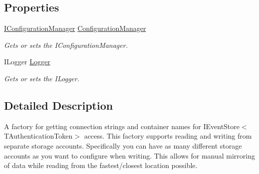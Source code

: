 \subsection*{Properties}
\begin{DoxyCompactItemize}
\item 
\hyperlink{interfaceCqrs_1_1Configuration_1_1IConfigurationManager}{I\+Configuration\+Manager} \hyperlink{classCqrs_1_1Azure_1_1BlobStorage_1_1Events_1_1BlobStorageEventStoreConnectionStringFactory_adefd82b19551d994e27ce92bb0f0103d_adefd82b19551d994e27ce92bb0f0103d}{Configuration\+Manager}
\begin{DoxyCompactList}\small\item\em Gets or sets the I\+Configuration\+Manager. \end{DoxyCompactList}\item 
I\+Logger \hyperlink{classCqrs_1_1Azure_1_1BlobStorage_1_1Events_1_1BlobStorageEventStoreConnectionStringFactory_a3149133c39d832a1ea78542bae2a9c2a_a3149133c39d832a1ea78542bae2a9c2a}{Logger}
\begin{DoxyCompactList}\small\item\em Gets or sets the I\+Logger. \end{DoxyCompactList}\end{DoxyCompactItemize}


\subsection{Detailed Description}
A factory for getting connection strings and container names for I\+Event\+Store$<$\+T\+Authentication\+Token$>$ access. This factory supports reading and writing from separate storage accounts. Specifically you can have as many different storage accounts as you want to configure when writing. This allows for manual mirroring of data while reading from the fastest/closest location possible. 



